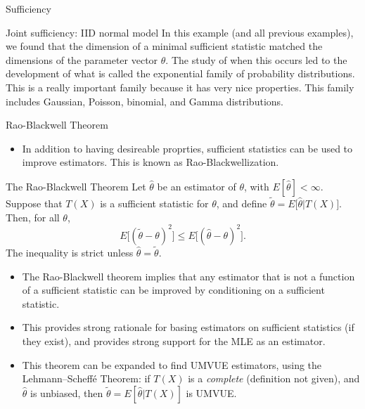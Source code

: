 \begin{frame}[allowframebreaks]{Sufficiency}
\begin{exampleblock}{Joint sufficiency: IID normal model}
{    In this example (and all previous examples), we found that the dimension of a minimal sufficient statistic matched the dimensions of the parameter vector $\theta$. The study of when this occurs led to the development of what is called the \alert{exponential family} of probability distributions.
    This is a really important family because it has very nice properties. This family includes Gaussian, Poisson, binomial, and Gamma distributions.
  }

\end{exampleblock}

\end{frame}

\begin{frame}[allowframebreaks]{Rao-Blackwell Theorem}
  \begin{itemize}
    \item In addition to having desireable proprties, sufficient statistics can be used to improve estimators. This is known as \alert{Rao-Blackwellization}.
  \end{itemize}

  \begin{block}{The Rao-Blackwell Theorem}
    Let $\hat{\theta}$ be an estimator of $\theta$, with $E[\hat{\theta}] < \infty$. Suppose that $T(X)$ is a sufficient statistic for $\theta$, and define $\tilde{\theta} = E\big[\hat{\theta}| T(X)\big]$. Then, for all $\theta$,
    $$
    E\big[(\tilde{\theta} - \theta)^2\big] \leq E\big[(\hat{\theta} - \theta)^2\big].
    $$
    The inequality is strict unless $\hat{\theta} = \tilde{\theta}$.
  \end{block}

  \framebreak

  \begin{itemize}
    \item The Rao-Blackwell theorem implies that any estimator that is not a function of a sufficient statistic can be improved by conditioning on a sufficient statistic.
    \item This provides strong rationale for basing estimators on sufficient statistics (if they exist), and provides strong support for the MLE as an estimator.
    \item This theorem can be expanded to find UMVUE estimators, using the Lehmann–Scheff\'e Theorem: if $T(X)$ is a \emph{complete} (definition not given), and $\hat{\theta}$ is unbiased, then $\tilde{\theta} = E[\hat{\theta}|T(X)]$ is UMVUE.
  \end{itemize}


\end{frame}
